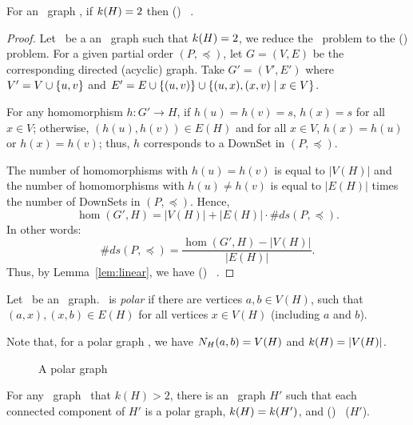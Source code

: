 \begin{lemma} \label{lem:triangle-free}
For an \RBA\ graph \mH, if \(k(H)=2\) then \chom(\mH) \mapge\ \cbis\@.
\end{lemma}

\begin{proof}
Let \mH\ be a an \RBA\ graph such that \(k(H)=2\), 
we reduce the \cds\ problem to the \chom(\mH) problem\@.
For a given partial order \((P,\preceq)\), let \(G=(V,E)\) be the corresponding directed
(acyclic) graph. Take \(G'=(V',E')\) where
\(V'= V \cup \{{u,v}\}\) and \(E' = E \cup \{{(u,v)}\} \cup
\{{(u,x),(x,v) \mid x\in V}\}\)\@.

For any homomorphism \(h: G' \to H\), if \(h(u)=h(v)=s\), \(h(x)=s\) for all \(x\in V\);
otherwise, \((h(u),h(v))\in E(H)\) and for all \(x\in V\), \(h(x)=h(u)\) or \(h(x)=h(v)\); thus,
\(h\) corresponds to a DownSet in \((P,\preceq)\)\@.

The number of homomorphisms with \(h(u)=h(v)\) is equal to \(|V(H)|\) and
the number of homomorphisms with \(h(u)\neq h(v)\) is equal to \(|E(H)|\) times the 
number of DownSets in \((P,\preceq)\)\@. Hence,
\[\hom(G',H) = |V(H)| + |E(H)|\cdot \#ds(P,\preceq).\]
In other words:
\[\#ds(P,\preceq) = \frac{\hom(G',H) - |V(H)|}{|E(H)|}.\]
Thus, by Lemma~\ref{lem:linear}, we have \chom(\mH) \mapge\ \cds\@.
\end{proof}

\begin{defi} 
Let \mH\ be an \RBA\ graph. \mH\ is \emph{polar}
if there are vertices \(a,b\in V(H)\),
such that \((a,x), (x,b) \in E(H)\) for all vertices \(x \in V(H)\) (including \(a\) and \(b\)).
\end{defi}

Note that, for a polar graph \mH, we have \(N_{H}({a},{b}) = V(H)\) and \(k(H)=|V(H)|\)\@.

\begin{figure}[h]
\center{}
\caption{A polar graph}
\end{figure}

\begin{lemma} \label{lem:k-fixing}
For any \RBA\ graph \mH\ that \(k(H) > 2\), there is an \RBA\ graph
\(H'\) such that each connected component of \(H'\) is a
polar graph, \(k(H) = k(H')\), and
\chom(\mH) \mapge\ \chom(\(H'\)).
\end{lemma}

